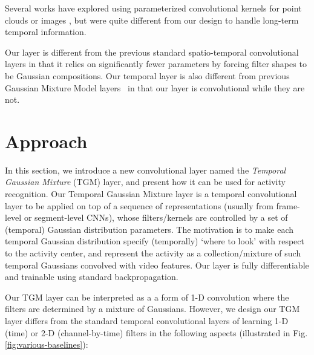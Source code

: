 \documentclass{article}
\begin{document}
Several works have explored using parameterized convolutional kernels for point clouds \cite{xu2018spidercnn} or images \cite{cohen2018spherical}, but were quite different from our design to handle long-term temporal information.

Our layer is different from the previous standard spatio-temporal convolutional layers in that it relies on significantly fewer parameters by forcing filter shapes to be Gaussian compositions. Our temporal layer is also different from previous Gaussian Mixture Model layers~\citep{variani2015gaussian} in that our layer is convolutional while they are not.


\section{Approach}

In this section, we introduce a new convolutional layer named the \emph{Temporal Gaussian Mixture} (TGM) layer, and present how it can be used for activity recognition. Our Temporal Gaussian Mixture layer is a temporal convolutional layer to be applied on top of a sequence of representations (usually from frame-level or segment-level CNNs), whose filters/kernels are controlled by a set of (temporal) Gaussian distribution parameters. The motivation is to make each temporal Gaussian distribution specify (temporally) `where to look' with respect to the activity center, and represent the activity as a collection/mixture of such temporal Gaussians convolved with video features. Our layer is fully differentiable and trainable using standard backpropagation.

Our TGM layer can be interpreted as a a form of 1-D convolution where the filters are determined by a mixture of Gaussians. However, we design our TGM layer differs from the standard temporal convolutional layers of learning 1-D (time) or 2-D (channel-by-time) filters in the following aspects (illustrated in Fig. \ref{fig:various-baselines}):
\end{document}
